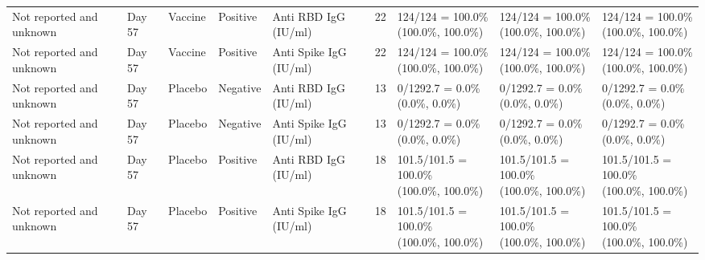 \documentclass[]{book}
\theoremstyle{definition}
\theoremstyle{definition}
\theoremstyle{definition}
\newcommand{\1}{\mathbbm{1}}
\begin{document}
\begin{landscape}
\begin{ThreePartTable}
\begin{longtable}[t]{>{\raggedright\arraybackslash}p{2.7cm}llllllll}
\hspace{1em}Not reported and unknown & Day 57 & Vaccine & Positive & Anti RBD IgG (IU/ml) & 22 & \makecell[l]{124/124 = 100.0\%\\(100.0\%, 100.0\%)} & \makecell[l]{124/124 = 100.0\%\\(100.0\%, 100.0\%)} & \makecell[l]{124/124 = 100.0\%\\(100.0\%, 100.0\%)}\\
\hspace{1em}Not reported and unknown & Day 57 & Vaccine & Positive & Anti Spike IgG (IU/ml) & 22 & \makecell[l]{124/124 = 100.0\%\\(100.0\%, 100.0\%)} & \makecell[l]{124/124 = 100.0\%\\(100.0\%, 100.0\%)} & \makecell[l]{124/124 = 100.0\%\\(100.0\%, 100.0\%)}\\
\hspace{1em}Not reported and unknown & Day 57 & Placebo & Negative & Anti RBD IgG (IU/ml) & 13 & \makecell[l]{0/1292.7 = 0.0\%\\(0.0\%, 0.0\%)} & \makecell[l]{0/1292.7 = 0.0\%\\(0.0\%, 0.0\%)} & \makecell[l]{0/1292.7 = 0.0\%\\(0.0\%, 0.0\%)}\\
\hspace{1em}Not reported and unknown & Day 57 & Placebo & Negative & Anti Spike IgG (IU/ml) & 13 & \makecell[l]{0/1292.7 = 0.0\%\\(0.0\%, 0.0\%)} & \makecell[l]{0/1292.7 = 0.0\%\\(0.0\%, 0.0\%)} & \makecell[l]{0/1292.7 = 0.0\%\\(0.0\%, 0.0\%)}\\
\hspace{1em}Not reported and unknown & Day 57 & Placebo & Positive & Anti RBD IgG (IU/ml) & 18 & \makecell[l]{101.5/101.5 = 100.0\%\\(100.0\%, 100.0\%)} & \makecell[l]{101.5/101.5 = 100.0\%\\(100.0\%, 100.0\%)} & \makecell[l]{101.5/101.5 = 100.0\%\\(100.0\%, 100.0\%)}\\
\hspace{1em}Not reported and unknown & Day 57 & Placebo & Positive & Anti Spike IgG (IU/ml) & 18 & \makecell[l]{101.5/101.5 = 100.0\%\\(100.0\%, 100.0\%)} & \makecell[l]{101.5/101.5 = 100.0\%\\(100.0\%, 100.0\%)} & \makecell[l]{101.5/101.5 = 100.0\%\\(100.0\%, 100.0\%)}\\*
\end{longtable}
\end{ThreePartTable}



\end{landscape}
\end{document}
